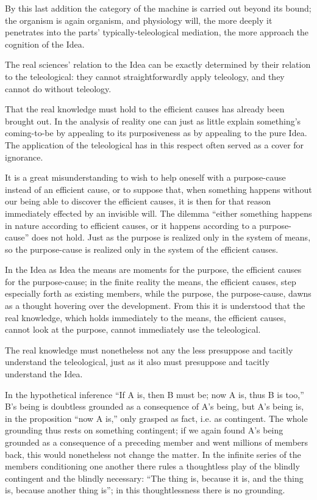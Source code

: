 \documentclass[12pt]{book}
\begin{document}
By this last addition the category of the machine is carried out beyond its bound; the organism is again
organism, and physiology will, the more deeply it penetrates into the parts' typically-teleological
mediation, the more approach the cognition of the Idea.

The real sciences' relation to the Idea can be exactly determined by their relation to the teleological:
they cannot straightforwardly apply teleology, and they cannot do without teleology.

That the real knowledge must hold to the efficient causes has already been brought out. In the analysis
of reality one can just as little explain something's coming-to-be by appealing to its purposiveness as
by appealing to the pure Idea. The application of the teleological has in this respect often served as a
cover for ignorance.

It is a great misunderstanding to wish to help oneself with a purpose-cause instead of an efficient
cause, or to suppose that, when something happens without our being able to discover the efficient
causes, it is then for that reason immediately effected by an invisible will. The dilemma ``either
something happens in nature according to efficient causes, or it happens according to a purpose-cause''
does not hold. Just as the purpose is realized only in the system of means, so the purpose-cause is
realized only in the system of the efficient causes.

In the Idea as Idea the means are moments for the purpose, the efficient causes for the purpose-cause; in
the finite reality the means, the efficient causes, step especially forth as existing members, while the
purpose, the purpose-cause, dawns as a thought hovering over the development.
From this it is understood that the real knowledge, which holds immediately to the means, the efficient
causes, cannot look at the purpose, cannot immediately use the teleological.

The real knowledge must nonetheless not any the less presuppose and tacitly understand the teleological,
just as it also must presuppose and tacitly understand the Idea.

In the hypothetical inference ``If A is, then B must be; now A is, thus B is too,'' B's being is doubtless
grounded as a consequence of A's being, but A's being is, in the proposition ``now A is,'' only grasped
as fact, i.e. as contingent. The whole grounding thus rests on something contingent; if we again found
A's being grounded as a consequence of a preceding member and went millions of members back, this would
nonetheless not change the matter. In the infinite series of the members conditioning one another there
rules a thoughtless play of the blindly contingent and the blindly necessary: ``The thing is,
because it is, and the thing is,
because another thing is''; in this thoughtlessness there is no grounding.
\end{document}
